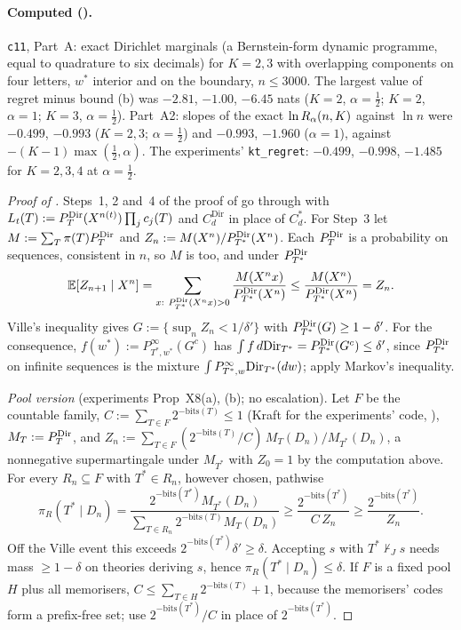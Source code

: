 \paragraph{Computed ().} \texttt{c11}, Part~A: exact Dirichlet marginals (a Bernstein-form dynamic programme, equal to quadrature to six decimals) for $K=2,3$ with overlapping components on four letters, $w^*$ interior and on the boundary, $n\le3000$. The largest value of regret minus bound (b) was $-2.81$, $-1.00$, $-6.45$ nats ($K=2$, $\alpha=\tfrac12$; $K=2$, $\alpha=1$; $K=3$, $\alpha=\tfrac12$). Part~A2: slopes of the exact $\ln R_{\alpha}(n,K)$ against $\ln n$ were $-0.499$, $-0.993$ ($K=2,3$; $\alpha=\tfrac12$) and $-0.993$, $-1.960$ ($\alpha=1$), against $-(K-1)\max(\tfrac12,\alpha)$. The experiments' \texttt{kt\_regret}: $-0.499$, $-0.998$, $-1.485$ for $K=2,3,4$ at $\alpha=\tfrac12$.

\begin{proof}[Proof of ]
Steps~1, 2 and~4 of the proof of  go through with $L_t(T):=P^{\mathrm{Dir}}_{T}(X^{n(t)})\prod_jc_j(T)$ and $C^{\mathrm{Dir}}_d$ in place of $C^*_d$. For Step~3 let $M:=\sum_T\pi(T)P^{\mathrm{Dir}}_{T}$ and $Z_n:=M(X^n)/P^{\mathrm{Dir}}_{T^*}(X^n)$. Each $P^{\mathrm{Dir}}_{T}$ is a probability on sequences, consistent in $n$, so $M$ is too, and under $P^{\mathrm{Dir}}_{T^*}$
\[
\Ex[Z_{n+1}\mid X^n]=\sum_{x:\ \PDir{T^*}(X^nx)>0}\frac{M(X^nx)}{\PDir{T^*}(X^n)}\le\frac{M(X^n)}{\PDir{T^*}(X^n)}=Z_n .
\]
Ville's inequality gives $G:=\{\sup_nZ_n<1/\delta'\}$ with $P^{\mathrm{Dir}}_{T^*}(G)\ge1-\delta'$. For the consequence, $f(w^*):=P^\infty_{T^*,w^*}(G^c)$ has $\int f\,d\mathrm{Dir}_{T^*}=P^{\mathrm{Dir}}_{T^*}(G^c)\le\delta'$, since $P^{\mathrm{Dir}}_{T^*}$ on infinite sequences is the mixture $\int P^\infty_{T^*,w}\mathrm{Dir}_{T^*}(dw)$; apply Markov's inequality.

\emph{Pool version} (experiments Prop~X8(a), (b); no escalation). Let $F$ be the countable family, $C:=\sum_{T\in F}2^{-\mathrm{bits}(T)}\le1$ (Kraft for the experiments' code, ), $M_T:=P^{\mathrm{Dir}}_{T}$, and $Z_n:=\sum_{T\in F}(2^{-\mathrm{bits}(T)}/C)\,M_T(D_n)/M_{T^*}(D_n)$, a nonnegative supermartingale under $M_{T^*}$ with $Z_0=1$ by the computation above. For every $R_n\subseteq F$ with $T^*\in R_n$, however chosen, pathwise
\[
\pi_R(T^*\mid D_n)=\frac{2^{-\mathrm{bits}(T^*)}M_{T^*}(D_n)}{\sum_{T\in R_n}2^{-\mathrm{bits}(T)}M_T(D_n)}\ge\frac{2^{-\mathrm{bits}(T^*)}}{C\,Z_n}\ge\frac{2^{-\mathrm{bits}(T^*)}}{Z_n}.
\]
Off the Ville event this exceeds $2^{-\mathrm{bits}(T^*)}\delta'\ge\delta$. Accepting $s$ with $T^*\nvdash_Js$ needs mass $\ge1-\delta$ on theories deriving $s$, hence $\pi_R(T^*\mid D_n)\le\delta$. If $F$ is a fixed pool $H$ plus all memorisers, $C\le\sum_{T\in H}2^{-\mathrm{bits}(T)}+1$, because the memorisers' codes form a prefix-free set; use $2^{-\mathrm{bits}(T^*)}/C$ in place of $2^{-\mathrm{bits}(T^*)}$.
\end{proof}

